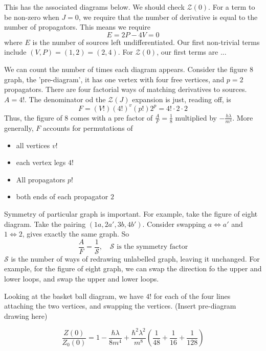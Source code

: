 \documentclass[11pt, oneside]{article}   	%
\theoremstyle{slanted}
\begin{document}
This has the associated diagrams below. 
We should check $ \mathcal{ Z } \left( 0  \right)  $. 
For a term to be non-zero when $ J = 0 $, 
we require that the number of derivative is equal to 
the number of propagators. 
This means we require 
\[
 E = 2P - 4 V  =0 
\]  where $ E $ is the number of sources 
left undifferentiated. 
Our first non-trivial terms include 
$ \left( V , P  \right)   = \left( 1, 2  \right)   = \left( 2, 4  \right)  $. 
For $ \mathcal{ Z } \left( 0  \right)  $, our first terms 
are ... 

We can count the number of times each diagram appears. 
Consider the figure 8 graph, the 'pre-diagram', 
it has one vertex with four free vertices, 
and $ p = 2 $ propagators. 
There are four factorial ways of matching 
derivatives to sources. $ A  = 4 ! $. 
The denominator od the $ \mathcal{ Z } \left( J  \right)  $ 
expansion is just, reading off, 
is 
\[
	F = \left( V !  \right)  \left( 4 !  \right)  ^{ v } \left( p !  \right)  
	2 ^ p  = 4  ! \cdot  2 \cdot  2 
\] Thus, the figure of $ 8 $ comes 
with a pre factor of $ \frac{A}{F }  = \frac{1}{8 } $ multiplied 
by $ - \frac{h \lambda }{ m ^  4 }  $. 
More generally, $ F $ accounts for permutations of 
\begin{itemize}
	\item all vertices $ v ! $ 
	\item each vertex legs $ 4 ! $ 
	\item All propagators $ p ! $ 
	\item both ends of each propagator $ 2 $ 
\end{itemize}
Symmetry of particular graph is 
important. 
For example, take the figure of eight diagram. 
Take the pairing  $ \left( 1a, 2a', 3b, 4b'  \right)  $.
Consider swapping $ a \iff a'  $  and $ 1 \iff 2  $, 
gives exactly the same graph. 
So 
\[
 \frac{A}{F }   = \frac{1}{\mathcal{ S } }, \quad \mathcal{ S } \text{ is the symmetry factor}
\] $ \mathcal{ S } $ is the number of 
ways of redrawing unlabelled graph, 
leaving it unchanged. 
For example, 
for the figure of eight graph, we can 
swap the direction fo the upper and lower loops, 
and swap the upper and lower loops. 

Looking at the basket ball diagram, 
we have $ 4 ! $ for each of the four lines attaching the two vertices, 
and swapping the vertices. 
(Insert pre-diagram drawing here)

\[
	\frac{ Z( 0 ) }{ Z _ 0 \left( 0  \right)  } 
	 = 1 - \frac{ \hbar \lambda }{ 8 m ^ 4 } + \frac{ \hbar ^ 2 \lambda ^ 2 }{ m ^ 8 } 
	 \left( \frac{1}{48 } + \frac{1}{16 } + \frac{1}{128 } \right) 
\]
\end{document}

